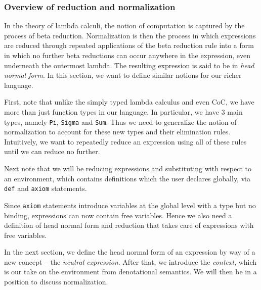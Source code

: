 \documentclass{article}
\begin{document}
\subsubsection{Overview of reduction and normalization}
In the theory of lambda calculi, the notion of computation is captured by the
process of beta reduction. Normalization is then the process in which
expressions are reduced through repeated applications of the beta reduction
rule into a form in which no further beta reductions can occur anywhere in the
expression, even underneath the outermost lambda.
The resulting expression is said to be in \textit{head normal form}. 
In this section, we want to define similar notions for our richer language.

First, note that unlike the simply typed lambda calculus and even CoC, we have more
than just function types in our language. In particular, we have 3 main types,
namely \verb|Pi|, \verb|Sigma| and \verb|Sum|.
Thus we need to generalize the notion of normalization to account for these new
types and their elimination rules. Intuitively, we want to repeatedly reduce
an expression using all of these rules until we can reduce no further.

Next note that we will be reducing expressions and substituting with
respect to an environment, which contains definitions which the user declares
globally, via \verb|def| and \verb|axiom| statements.

Since \verb|axiom| statements introduce variables at the global level with a
type but no binding, expressions can now contain free variables.
Hence we also need a definition of head normal form and reduction
that takes care of expressions with free variables.

In the next section, we define the head normal form of an expression by way of
a new concept -- the \textit{neutral expression}.
After that, we introduce the \textit{context}, which is our take on the
environment from denotational semantics.
We will then be in a position to discuss normalization.



\end{document}
